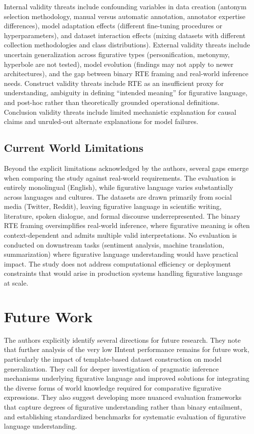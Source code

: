 \documentclass[12pt]{article}
\begin{document}
Internal validity threats include confounding variables in data creation (antonym selection methodology, manual versus automatic annotation, annotator expertise differences), model adaptation effects (different fine-tuning procedures or hyperparameters), and dataset interaction effects (mixing datasets with different collection methodologies and class distributions). External validity threats include uncertain generalization across figurative types (personification, metonymy, hyperbole are not tested), model evolution (findings may not apply to newer architectures), and the gap between binary RTE framing and real-world inference needs. Construct validity threats include RTE as an insufficient proxy for understanding, ambiguity in defining ``intended meaning'' for figurative language, and post-hoc rather than theoretically grounded operational definitions. Conclusion validity threats include limited mechanistic explanation for causal claims and unruled-out alternate explanations for model failures.

\subsection{Current World Limitations}

Beyond the explicit limitations acknowledged by the authors, several gaps emerge when comparing the study against real-world requirements. The evaluation is entirely monolingual (English), while figurative language varies substantially across languages and cultures. The datasets are drawn primarily from social media (Twitter, Reddit), leaving figurative language in scientific writing, literature, spoken dialogue, and formal discourse underrepresented. The binary RTE framing oversimplifies real-world inference, where figurative meaning is often context-dependent and admits multiple valid interpretations. No evaluation is conducted on downstream tasks (sentiment analysis, machine translation, summarization) where figurative language understanding would have practical impact. The study does not address computational efficiency or deployment constraints that would arise in production systems handling figurative language at scale.

\section{Future Work}

The authors explicitly identify several directions for future research. They note that further analysis of the very low IIntent performance remains for future work, particularly the impact of template-based dataset construction on model generalization. They call for deeper investigation of pragmatic inference mechanisms underlying figurative language and improved solutions for integrating the diverse forms of world knowledge required for comparative figurative expressions. They also suggest developing more nuanced evaluation frameworks that capture degrees of figurative understanding rather than binary entailment, and establishing standardized benchmarks for systematic evaluation of figurative language understanding.
\end{document}
